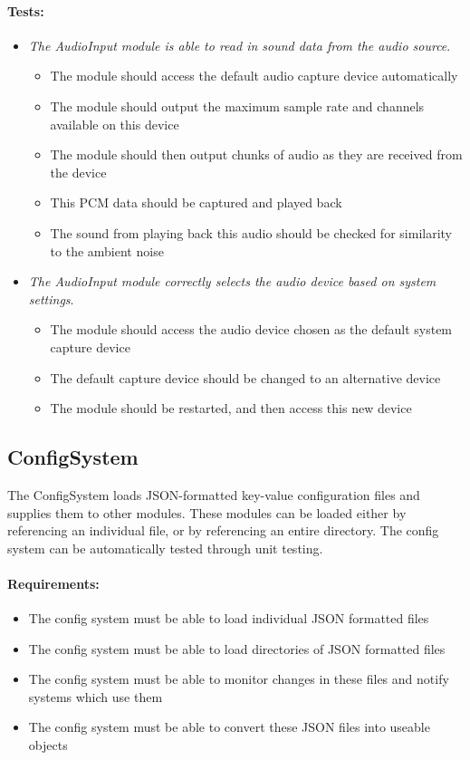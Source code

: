 \documentclass[english,12pt]{scrartcl}
\newcounter{testcounter}
\newcommand{\test}[1] {
	\stepcounter{testcounter}
	\item[] \emph{#1}.}
\begin{document}
		\paragraph{Tests:}
		\begin{itemize}
			\test{The AudioInput module is able to read in sound data from the audio source}
			\begin{itemize}
				\item The module should access the default audio capture device automatically
				\item The module should output the maximum sample rate and channels available on this device
				\item The module should then output chunks of audio as they are received from the device
				\item This PCM data should be captured and played back
				\item The sound from playing back this audio should be checked for similarity to the ambient noise
			\end{itemize}
			\test{The AudioInput module correctly selects the audio device based on system settings}
			\begin{itemize}
				\item The module should access the audio device chosen as the default system capture device
				\item The default capture device should be changed to an alternative device
				\item The module should be restarted, and then access this new device
			\end{itemize}
		\end{itemize}

	\subsection{ConfigSystem}
		The ConfigSystem loads JSON-formatted key-value configuration files and supplies them to other modules.
		These modules can be loaded either by referencing an individual file, or by referencing an entire directory.
		The config system can be automatically tested through unit testing.

		\paragraph{Requirements:}
		\begin{itemize}
			\item The config system must be able to load individual JSON formatted files
			\item The config system must be able to load directories of JSON formatted files
			\item The config system must be able to monitor changes in these files and notify systems which use them
			\item The config system must be able to convert these JSON files into useable objects
		\end{itemize}
\end{document}
